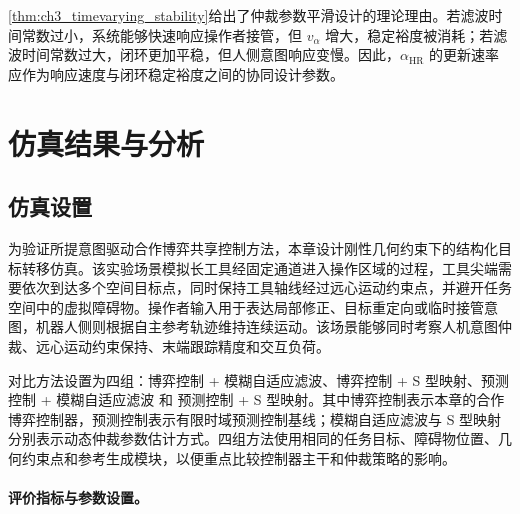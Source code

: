 \begin{remark}
\label{rem:ch3_engineering}
\cref{thm:ch3_timevarying_stability}给出了仲裁参数平滑设计的理论理由。若滤波时间常数过小，系统能够快速响应操作者接管，但 $v_\alpha$ 增大，稳定裕度被消耗；若滤波时间常数过大，闭环更加平稳，但人侧意图响应变慢。因此，$\alpha_{\mathrm{HR}}$ 的更新速率应作为响应速度与闭环稳定裕度之间的协同设计参数。
\end{remark}

\section{仿真结果与分析}
\label{sec:ch3_simulation}

\subsection{仿真设置}
\label{subsec:ch3_sim_task}

为验证所提意图驱动合作博弈共享控制方法，本章设计刚性几何约束下的结构化目标转移仿真。该实验场景模拟长工具经固定通道进入操作区域的过程，工具尖端需要依次到达多个空间目标点，同时保持工具轴线经过远心运动约束点，并避开任务空间中的虚拟障碍物。操作者输入用于表达局部修正、目标重定向或临时接管意图，机器人侧则根据自主参考轨迹维持连续运动。该场景能够同时考察人机意图仲裁、远心运动约束保持、末端跟踪精度和交互负荷。

对比方法设置为四组：博弈控制 + 模糊自适应滤波、博弈控制 + S 型映射、预测控制 + 模糊自适应滤波 和 预测控制 + S 型映射。其中博弈控制表示本章的合作博弈控制器，预测控制表示有限时域预测控制基线；模糊自适应滤波与 S 型映射分别表示动态仲裁参数估计方式。四组方法使用相同的任务目标、障碍物位置、几何约束点和参考生成模块，以便重点比较控制器主干和仲裁策略的影响。

\paragraph{评价指标与参数设置。}
\label{subsec:ch3_metrics}

